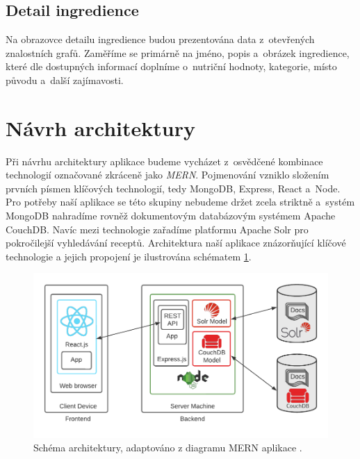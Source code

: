 \subsection{Detail ingredience}

Na obrazovce detailu ingredience budou prezentována data z~otevřených znalostních grafů. Zaměříme se primárně na jméno, popis a~obrázek ingredience, které dle dostupných informací doplníme o~nutriční hodnoty, kategorie, místo původu a~další zajímavosti.

\section{Návrh architektury}

Při návrhu architektury aplikace budeme vycházet z~osvědčené kombinace technologií označované zkráceně jako \emph{MERN}. Pojmenování vzniklo složením prvních písmen klíčových technologií, tedy MongoDB, Express, React a~Node. Pro potřeby naší aplikace se této skupiny nebudeme držet zcela striktně a~systém MongoDB nahradíme rovněž dokumentovým databázovým systémem Apache \,CouchDB. Navíc mezi technologie zařadíme platformu Apache Solr pro pokročilejší vyhledávání receptů. Architektura naší aplikace znázorňující klíčové technologie a jejich propojení je ilustrována schématem \ref{obr02:architecture}. 

\begin{figure}[h!]\centering
\includegraphics[width=140mm]{../img/architecture}
\caption{Schéma architektury, adaptováno z diagramu MERN aplikace \citep{mern-stack}.}
\label{obr02:architecture}
\end{figure}

